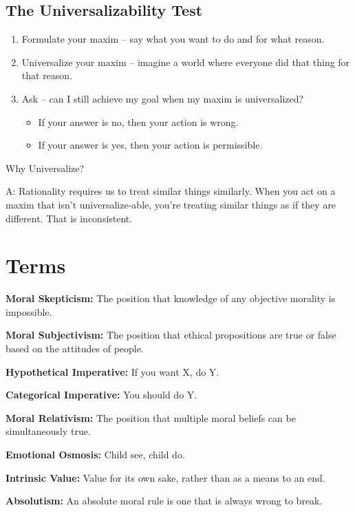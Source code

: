\documentclass[12pt]{article}
\begin{document}
\subsection{The Universalizability Test}
\begin{enumerate}
    \item Formulate your maxim -- say what you want to do and for what reason.
    \item Universalize your maxim -- imagine a world where everyone did that thing for that reason.
    \item Ask -- can I still achieve my goal when my maxim is universalized?
          \begin{itemize}
              \item If your answer is no, then your action is wrong.
              \item If your answer is yes, then your action is permissible.
          \end{itemize}
\end{enumerate}

Why Universalize?

A: Rationality requires us to treat similar things similarly. When you act on a maxim that isn't universalize-able, you're treating similar things as if they are different. That is inconsistent.

\section{Terms}

\noindent

\textbf{Moral Skepticism:} The position that knowledge of any objective morality is impossible.

\textbf{Moral Subjectivism:} The position that ethical propositions are true or false based on the attitudes of people.

\textbf{Hypothetical Imperative:} If you want X, do Y.

\textbf{Categorical Imperative:} You should do Y.

\textbf{Moral Relativism:} The position that multiple moral beliefs can be simultaneously true.

\textbf{Emotional Osmosis:} Child see, child do.

\textbf{Intrinsic Value:} Value for its own sake, rather than as a means to an end.

\textbf{Absolutism:} An absolute moral rule is one that is always wrong to break.
\end{document}
